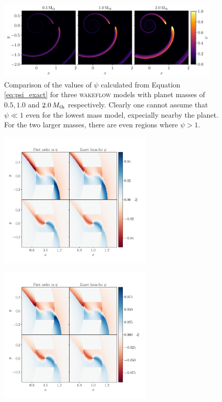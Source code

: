 \begin{figure}[H]
    \centering
    \includegraphics[width = 0.95\textwidth]{figures/psi 2.pdf}
    \caption{Comparison of the values of $\psi$ calculated from Equation \ref{eq:psi_exact} for three \textsc{wakeflow} models with planet masses of $0.5, 1.0$ and $2.0 \, M_{\rm{th}}$ respectively. Clearly one cannot assume that $\psi \ll 1$ even for the lowest mass model, expecially nearby the planet. For the two larger masses, there are even regions where $\psi > 1$.}
    \label{fig:psi_comparison}
\end{figure}

\begin{figure}[H]
    \centering
    \includegraphics[width = 0.65\textwidth]{figures/0_5_mth.pdf}
    \caption{}
    \label{fig:0_5mth}
\end{figure}

\begin{figure}[H]
    \centering
    \includegraphics[width = 0.65\textwidth]{figures/1_0_mth.pdf}
    \caption{}
    \label{fig:1_0mth}
\end{figure}

